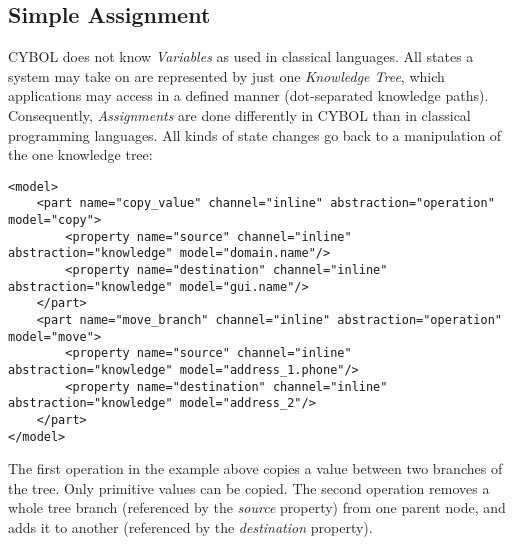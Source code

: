 %
%
%
%
%
%

\subsection{Simple Assignment}
\label{simple_assignment_heading}

CYBOL does not know \emph{Variables} as used in classical languages. All states
a system may take on are represented by just one \emph{Knowledge Tree}, which
applications may access in a defined manner (dot-separated knowledge paths).
Consequently, \emph{Assignments} are done differently in CYBOL than in
classical programming languages. All kinds of state changes go back to a
manipulation of the one knowledge tree:

\begin{scriptsize}
    \begin{verbatim}
<model>
    <part name="copy_value" channel="inline" abstraction="operation" model="copy">
        <property name="source" channel="inline" abstraction="knowledge" model="domain.name"/>
        <property name="destination" channel="inline" abstraction="knowledge" model="gui.name"/>
    </part>
    <part name="move_branch" channel="inline" abstraction="operation" model="move">
        <property name="source" channel="inline" abstraction="knowledge" model="address_1.phone"/>
        <property name="destination" channel="inline" abstraction="knowledge" model="address_2"/>
    </part>
</model>
    \end{verbatim}
\end{scriptsize}

The first operation in the example above copies a value between two branches of
the tree. Only primitive values can be copied. The second operation removes a
whole tree branch (referenced by the \emph{source} property) from one parent
node, and adds it to another (referenced by the \emph{destination} property).
